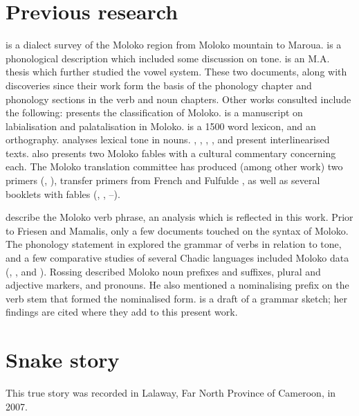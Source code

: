 \section{Previous research}\label{sec:1.3}
\hypertarget{RefHeading1210301525720847}{}
\citet{Bradley1992} is a dialect survey of the Moloko region from Moloko mountain to Maroua. \citet{Bow1997c} is a phonological description which included some discussion on tone. \citet{Bow1999} is an M.A. thesis which further studied the vowel system.  These two documents, along with discoveries since their work form the basis of the phonology chapter and phonology sections in the verb and noun chapters. Other works consulted include the following:  \citet{Bow1997a} presents the classification of Moloko. \citet{Bow1997b} is a manuscript on labialisation and palatalisation in Moloko. \citet{StarrBoydBow2000} is a 1500 word lexicon, and \citet{Friesen2001} an orthography.  \citet{Boyd2002} analyses lexical tone in nouns.  \citet{Boyd2001}, \citet{OumarBoyd2002}, \citet{HolmakaBoyd2002}, \citet{Holmaka2002}, and \citet{Friesen2003} present interlinearised texts. \citet{Friesen2003} also presents two Moloko fables with a cultural commentary concerning each.  The Moloko translation committee has produced (among other work) two primers (\citealt{MTC2004a}, \citeyear{MTC2008}), transfer primers from French \citep{MTC2005a} and Fulfulde \citep{MTC2007a}, as well as several booklets with fables (\citealt{MTC2004b}, \citeyear{MTC2005b}, \citeyear{MTC2007a}--\citeyear{MTC2007d}).\enlargethispage{1\baselineskip}

\citet{FriesenMamalis2008} describe the Moloko verb phrase, an analysis which is reflected in this work. Prior to Friesen and Mamalis, only a few documents touched on the syntax of Moloko. The phonology statement in \citeyear{Bow1997c} explored the grammar of verbs in relation to tone, and a few comparative studies of several Chadic languages included Moloko data (\citealt{Rossing1978}, \citealt{Blama1980}, and \citealt{deColombel1982}). Rossing described Moloko noun prefixes and suffixes, plural and adjective markers, and pronouns.  He also mentioned a nominalising prefix on the verb stem that formed the nominalised form. \citet{Boyd2003} is a draft of a grammar sketch; her findings are cited where they add to this present work. 

\clearpage
\section[Snake story]{Snake story\\\hspace{1.5em} \textnormal{}}\label{sec:1.4}
\hypertarget{RefHeading1210321525720847}{}
This true story was recorded in Lalaway, Far North Province of Cameroon, in 2007.  

